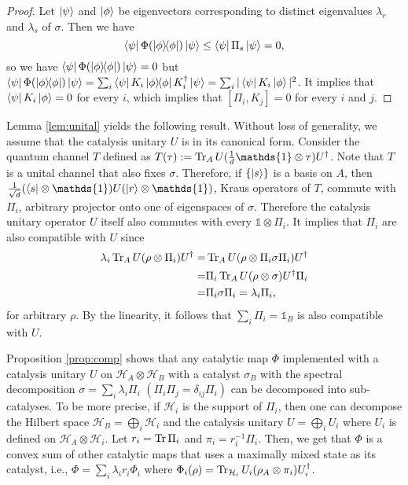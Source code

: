 \documentclass[aps, reprint, amsmath,amssymb, prx, superscriptaddress]{revtex4-2}
\begin{document}
\begin{proofEnd}
\begin{proof}
    Let $\ket{\psi}$ and $\ket{\phi}$ be eigenvectors corresponding to distinct eigenvalues $\lambda_r$ and $\lambda_s$ of $\sigma$. Then we have
    \begin{equation}
        \bra{\psi}\Phi(\dyad{\phi})\ket{\psi}\leq \bra{\psi}\Pi_s\ket{\psi}=0,
    \end{equation}
    so we have $\bra{\psi}\Phi(\dyad{\phi})\ket{\psi}=0$ but $\bra{\psi}\Phi(\dyad{\phi})\ket{\psi}=\sum_i \bra{\psi}K_i\dyad{\phi}K_i^\dag\ket{\psi}=\sum_i |\bra{\psi}K_i\ket{\phi}|^2$. It implies that $\bra{\psi}K_i\ket{\phi}=0$ for every $i$, which implies that $\left[\Pi_i,K_j\right]=0$ for every $i$ and $j$.
\end{proof}
Lemma \ref{lem:unital} yields the following result. Without loss of generality, we assume that the catalysis unitary $U$ is in its canonical form. Consider the quantum channel $T$ defined as  $T(\tau):=\Tr_A U(\frac{1}{d}\mathds{1}\otimes \tau)U^\dag$. Note that $T$ is a unital channel that also fixes $\sigma$. Therefore, if $\{\ket{s}\}$ is a basis on $A$, then $\frac{1}{\sqrt{d}}(\bra{s}\otimes \mathds{1})U(\ket{r}\otimes\mathds{1})$, Kraus operators of $T$, commute with $\Pi_i$, arbitrary projector onto one of eigenspaces of $\sigma$. Therefore the catalysis unitary operator $U$ itself also commutes with every $\mathds{1}\otimes \Pi_i$. It implies that $\Pi_i$ are also compatible with $U$ since
   \begin{align}
       \lambda_i \Tr_A U(\rho \otimes \Pi_i)U^\dag =& \Tr_A U(\rho \otimes \Pi_i \sigma \Pi_i)U^\dag \\
       =&\Pi_i \Tr_A U(\rho \otimes \sigma)U^\dag \Pi_i \\
       =&\Pi_i \sigma \Pi_i=\lambda_i \Pi_i,
   \end{align}
   for arbitrary $\rho$. By the linearity, it follows that $\sum_i \Pi_i=\mathds{1}_B$ is also compatible with $U$. 
\end{proofEnd}
Proposition \ref{prop:comp} shows that any catalytic map $\Phi$ implemented with a catalysis unitary $U$ on $\mathcal{H}_A\otimes\mathcal{H}_B$ with a catalyst $\sigma_B$ with the spectral decomposition $\sigma=\sum_i\lambda_i\Pi_i$ $(\Pi_i\Pi_j=\delta_{ij}\Pi_i)$ can be decomposed into sub-catalyses. To be more precise, if $\mathcal{H}_i$ is the support of $\Pi_i$, then one can decompose the Hilbert space $\mathcal{H}_B=\bigoplus_i \mathcal{H}_i$ and the catalysis unitary  $U=\bigoplus_i U_i$ where $U_i$ is defined on $\mathcal{H}_A\otimes\mathcal{H}_i$. Let $r_i=\Tr\Pi_i$ and $\pi_i=r_i^{-1}\Pi_i$. Then, we get that $\Phi$ is a convex sum of other catalytic maps that uses a maximally mixed state as its catalyst, i.e., $\Phi=\sum_i \lambda_i r_i \Phi_i$ where $\Phi_i(\rho)= \Tr_{\mathcal{H}_i} U_i(\rho_A\otimes\pi_i) U_i^\dag$.
\end{document}
